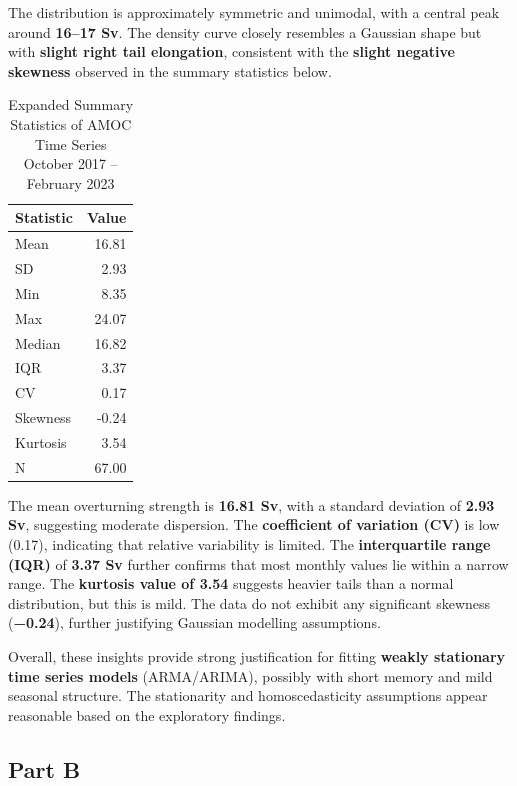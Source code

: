 \documentclass[
  11pt,
]{article}
\begin{document}
The distribution is approximately symmetric and unimodal, with a central
peak around \textbf{16--17 Sv}. The density curve closely resembles a
Gaussian shape but with \textbf{slight right tail elongation},
consistent with the \textbf{slight negative skewness} observed in the
summary statistics below.

\begin{table}
\caption*{
{\large Expanded Summary Statistics of AMOC Time Series} \\ 
{\small October 2017 – February 2023}
} 
\begin{tabular*}{\linewidth}{@{\extracolsep{\fill}}lr}
\toprule
Statistic & Value \\ 
\midrule\addlinespace[2.5pt]
Mean & 16.81 \\ 
SD & 2.93 \\ 
Min & 8.35 \\ 
Max & 24.07 \\ 
Median & 16.82 \\ 
IQR & 3.37 \\ 
CV & 0.17 \\ 
Skewness & -0.24 \\ 
Kurtosis & 3.54 \\ 
N & 67.00 \\ 
\bottomrule
\end{tabular*}
\end{table}

The mean overturning strength is \textbf{16.81 Sv}, with a standard
deviation of \textbf{2.93 Sv}, suggesting moderate dispersion. The
\textbf{coefficient of variation (CV)} is low (0.17), indicating that
relative variability is limited. The \textbf{interquartile range (IQR)}
of \textbf{3.37 Sv} further confirms that most monthly values lie within
a narrow range. The \textbf{kurtosis value of 3.54} suggests heavier
tails than a normal distribution, but this is mild. The data do not
exhibit any significant skewness (\textbf{−0.24}), further justifying
Gaussian modelling assumptions.

Overall, these insights provide strong justification for fitting
\textbf{weakly stationary time series models} (ARMA/ARIMA), possibly
with short memory and mild seasonal structure. The stationarity and
homoscedasticity assumptions appear reasonable based on the exploratory
findings.

\subsection{Part B}\label{part-b}
\end{document}
